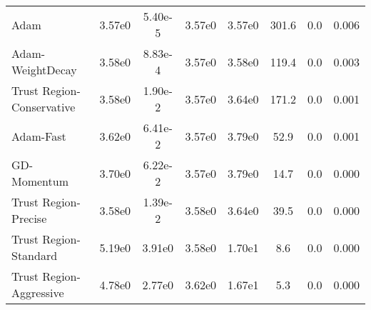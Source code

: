 \documentclass{article}
\begin{document}
\begin{table}[htbp]
{\begin{tabular}{p{2.5cm}*{7}{c}}
Adam & 3.57e0 & 5.40e-5 & 3.57e0 & 3.57e0 & 301.6 & 0.0 & 0.006 \\
Adam-WeightDecay & 3.58e0 & 8.83e-4 & 3.57e0 & 3.58e0 & 119.4 & 0.0 & 0.003 \\
Trust Region-Conservative & 3.58e0 & 1.90e-2 & 3.57e0 & 3.64e0 & 171.2 & 0.0 & 0.001 \\
Adam-Fast & 3.62e0 & 6.41e-2 & 3.57e0 & 3.79e0 & 52.9 & 0.0 & 0.001 \\
GD-Momentum & 3.70e0 & 6.22e-2 & 3.57e0 & 3.79e0 & 14.7 & 0.0 & 0.000 \\
Trust Region-Precise & 3.58e0 & 1.39e-2 & 3.58e0 & 3.64e0 & 39.5 & 0.0 & 0.000 \\
Trust Region-Standard & 5.19e0 & 3.91e0 & 3.58e0 & 1.70e1 & 8.6 & 0.0 & 0.000 \\
Trust Region-Aggressive & 4.78e0 & 2.77e0 & 3.62e0 & 1.67e1 & 5.3 & 0.0 & 0.000 \\
\bottomrule
\end{tabular}
}
\end{table}
\end{document}
